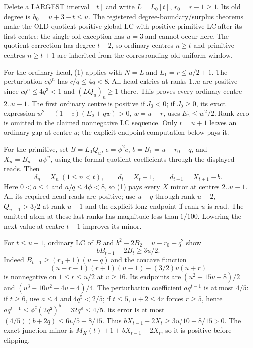 Delete a LARGEST interval $[t]$ and write $L=L_0[t]$,
$r_0=r-1\ge1$. Its old degree is $h_0=u+3-t\le u$.
The registered degree-boundary/surplus theorems make the OLD quotient
positive global LC with positive primitive LC after its first centre;
the single old exception has $u=3$ and cannot occur here.
The quotient correction has degree $t-2$, so ordinary centres
$n\ge t$ and primitive centres $n\ge t+1$ are inherited from
the corresponding old uniform window.

For the ordinary head, (1) applies with $N=L$ and
$L_1=r\le u/2+1$. The perturbation $c\psi^n$ has
$c/q\le4q<8$. All head entries at ranks $1..u$ are positive
since $c q^n\le4q^3<1$ and $(LQ_u)_n\ge1$ there.
This proves every ordinary centre $2..u-1$.
The first ordinary centre is positive if $J_0<0$; if $J_0\ge0$,
its exact expression $w^2-(1-c)(E_2+qw)>0$, $w=u+r$,
uses $E_2\le w^2/2$. Rank zero is omitted in the claimed
nonnegative LC sequence. Only $t=u+1$ leaves an ordinary gap at
centre $u$; the explicit endpoint computation below pays it.

For the primitive, set $B=L_0Q_u$, $a=\phi^2c$, $b=B_1=u+r_0-q$,
and $X_n=B_n-a\psi^n$, using the formal quotient coefficients
through the displayed reads. Then
\[
 d_n=X_n\ (1\le n<t),\qquad d_t=X_t-1,\qquad
 d_{t+1}=X_{t+1}-b.                                \tag{2}
\]
Here $0<a\le4$ and $a/q\le4\phi<8$, so (1) pays
every $X$ minor at centres $2..u-1$.
All its required head reads are positive; use $u-q$ through
rank $u-2$, $Q_{u-1}>3/2$ at rank $u-1$ and the explicit
long endpoint if rank $u$ is read. The omitted atom at these
last ranks has magnitude less than $1/100$.
Lowering the next value at centre $t-1$ improves its minor.

For $t\le u-1$, ordinary LC of $B$ and
$b^2-2B_2=u-r_0-q^2$ show
\[
 bB_{t-1}-2B_t\ge3u/2.
\]
Indeed $B_{t-1}\ge(r_0+1)(u-q)$ and the concave function
\[
 (u-r-1)(r+1)(u-1)-(3/2)u(u+r)
\]
is nonnegative on $1\le r\le u/2$ at $u\ge16$.
Its endpoints are $(u^2-15u+8)/2$ and
$(u^3-10u^2-4u+4)/4$.
The perturbation coefficient $a q^{t-1}$ is at most $4/5$:
if $t\ge6$, use $a\le4$ and $4q^5<2/5$; if $t\le5$,
$u+2\le4r$ forces $r\ge5$, hence
$a q^{t-1}\le\phi^2(2q^2)^5=32q^8\le4/5$.
Its error is at most $(4/5)(b+2q)\le6u/5+8/15$.
Thus $bX_{t-1}-2X_t\ge3u/10-8/15>0$.
The exact junction minor is $M_X(t)+1+bX_{t-1}-2X_t$,
so it is positive before clipping.


